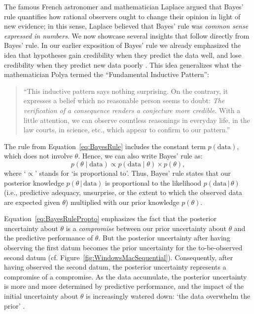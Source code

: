 \documentclass[man]{apa7}
\newcommand{\given}{\, | \,}
\begin{document}
The famous French astronomer and mathematician Laplace argued that Bayes' rule quantifies how rational observers ought to change their opinion in light of new evidence; in this sense, Laplace believed that Bayes' rule was \emph{common sense expressed in numbers}. We now showcase several insights that follow directly from Bayes' rule. In our earlier exposition of Bayes' rule we already emphasized the idea that hypotheses gain credibility when they predict the data well, and lose credibility when they predict new data poorly \parencite{WagenmakersEtAl2016CD}. This idea generalizes what the mathematician Polya termed the ``Fundamental Inductive Pattern'':
\begin{quotation}
``This inductive pattern says nothing surprising. On the contrary, it expresses a belief which no reasonable person seems to doubt: \emph{The verification of a consequence renders a conjecture more credible}. With a little attention, we can observe countless reasonings in everyday life, in the law courts, in science, etc., which appear to confirm to our pattern.'' \parencite[pp. 4-5]{Polya1954Vol2}
\end{quotation}

The rule from Equation~\ref{eq:BayesRule} includes the constant term $p(\text{data})$, which does not involve $\theta$. Hence, we can also write Bayes' rule as:
\begin{equation}
\label{eq:BayesRulePropto}
p(\theta \mid \text{data}) \propto  p(\text{data} \mid \theta) \times p(\theta),
\end{equation}
where `$\propto$' stands for `is proportional to'. Thus, Bayes' rule states that our posterior knowledge $p(\theta \given \text{data})$ is proportional to the likelihood $p(\text{data} \given \theta)$ (i.e., predictive adequacy, unsurprise, or the extent to which the observed data are expected given $\theta$) multiplied with our prior knowledge $p(\theta)$.

Equation~\ref{eq:BayesRulePropto} emphasizes the fact that the posterior uncertainty about $\theta$ is a \emph{compromise} between our prior uncertainty about $\theta$ and the predictive performance of $\theta$. But the posterior uncertainty after having observing the first datum becomes the prior uncertainty for the to-be-observed second datum (cf. Figure~\ref{fig:WindowsMacSequential}). Consequently, after having observed the second datum, the posterior uncertainty represents a compromise of a compromise. As the data accumulate, the posterior uncertainty is more and more determined by predictive performance, and the impact of the initial uncertainty about $\theta$ is increasingly watered down: `the data overwhelm the prior' \parencite{WrinchJeffreys1919}.
\end{document}
